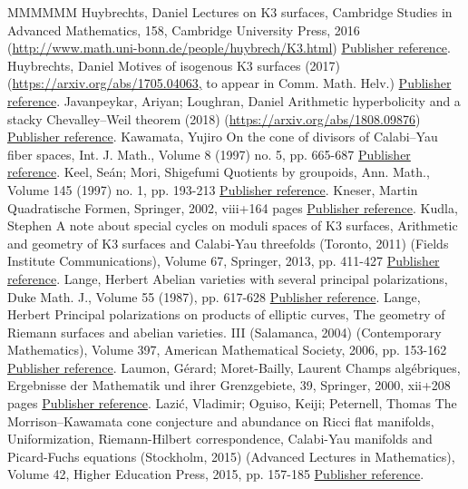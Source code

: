 \begin{thebibliography}{MMMMMM}
 Huybrechts, Daniel Lectures on K3 surfaces, Cambridge Studies in Advanced Mathematics, 158, Cambridge University Press, 2016 (\url{http://www.math.uni-bonn.de/people/huybrech/K3.html}) \href{https://ahl.centre-mersenne.org/item/AHL_2018__1__227_0/#HuyK3}{Publisher reference}.
 Huybrechts, Daniel Motives of isogenous K3 surfaces (2017) (\url{https://arxiv.org/abs/1705.04063,} to appear in Comm. Math. Helv.) \href{https://ahl.centre-mersenne.org/item/AHL_2018__1__227_0/#HuyMot}{Publisher reference}.
 Javanpeykar, Ariyan; Loughran, Daniel Arithmetic hyperbolicity and a stacky Chevalley–Weil theorem (2018) (\url{https://arxiv.org/abs/1808.09876}) \href{https://ahl.centre-mersenne.org/item/AHL_2018__1__227_0/#JL}{Publisher reference}.
 Kawamata, Yujiro On the cone of divisors of Calabi–Yau fiber spaces, Int. J. Math., Volume 8 (1997) no. 5, pp. 665-687 \href{https://ahl.centre-mersenne.org/item/AHL_2018__1__227_0/#Kaw}{Publisher reference}.
 Keel, Seán; Mori, Shigefumi Quotients by groupoids, Ann. Math., Volume 145 (1997) no. 1, pp. 193-213 \href{https://ahl.centre-mersenne.org/item/AHL_2018__1__227_0/#KM}{Publisher reference}.
 Kneser, Martin Quadratische Formen, Springer, 2002, viii+164 pages \href{https://ahl.centre-mersenne.org/item/AHL_2018__1__227_0/#Kneser}{Publisher reference}.
 Kudla, Stephen A note about special cycles on moduli spaces of K3 surfaces, Arithmetic and geometry of K3 surfaces and Calabi-Yau threefolds (Toronto, 2011) (Fields Institute Communications), Volume 67, Springer, 2013, pp. 411-427 \href{https://ahl.centre-mersenne.org/item/AHL_2018__1__227_0/#Kudla}{Publisher reference}.
 Lange, Herbert Abelian varieties with several principal polarizations, Duke Math. J., Volume 55 (1987), pp. 617-628 \href{https://ahl.centre-mersenne.org/item/AHL_2018__1__227_0/#La}{Publisher reference}.
 Lange, Herbert Principal polarizations on products of elliptic curves, The geometry of Riemann surfaces and abelian varieties. III (Salamanca, 2004) (Contemporary Mathematics), Volume 397, American Mathematical Society, 2006, pp. 153-162 \href{https://ahl.centre-mersenne.org/item/AHL_2018__1__227_0/#La2}{Publisher reference}.
 Laumon, Gérard; Moret-Bailly, Laurent Champs algébriques, Ergebnisse der Mathematik und ihrer Grenzgebiete, 39, Springer, 2000, xii+208 pages \href{https://ahl.centre-mersenne.org/item/AHL_2018__1__227_0/#LM}{Publisher reference}.
 Lazić, Vladimir; Oguiso, Keiji; Peternell, Thomas The Morrison–Kawamata cone conjecture and abundance on Ricci flat manifolds, Uniformization, Riemann-Hilbert correspondence, Calabi-Yau manifolds and Picard-Fuchs equations (Stockholm, 2015) (Advanced Lectures in Mathematics), Volume 42, Higher Education Press, 2015, pp. 157-185 \href{https://ahl.centre-mersenne.org/item/AHL_2018__1__227_0/#LazPet}{Publisher reference}.

\end{thebibliography}
